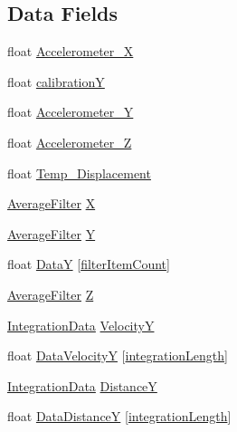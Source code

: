 \subsection*{Data Fields}
\begin{DoxyCompactItemize}
\item 
float \mbox{\hyperlink{struct_process_data___a92338f7520578c54d577bf8dd193186c}{Accelerometer\+\_\+X}}
\item 
float \mbox{\hyperlink{struct_process_data___a0630656d6ec984a6917aba7d0617d87b}{calibrationY}}
\item 
float \mbox{\hyperlink{struct_process_data___a1a3f3515022e230ceaf847b59f45d244}{Accelerometer\+\_\+Y}}
\item 
float \mbox{\hyperlink{struct_process_data___afe6d67e3ee7305c3f5fc242162aa13b2}{Accelerometer\+\_\+Z}}
\item 
float \mbox{\hyperlink{struct_process_data___ae36f07f578d32279404707bc16db33db}{Temp\+\_\+\+Displacement}}
\item 
\mbox{\hyperlink{filter__math__pincinato_8h_a05751bcbb0782121ff05ae3b7fc37dac}{Average\+Filter}} \mbox{\hyperlink{struct_process_data___a1dddeebb5e500ffea1704c56bad3e5de}{X}}
\item 
\mbox{\hyperlink{filter__math__pincinato_8h_a05751bcbb0782121ff05ae3b7fc37dac}{Average\+Filter}} \mbox{\hyperlink{struct_process_data___a999e007debe5468384855f5109e979c8}{Y}}
\item 
float \mbox{\hyperlink{struct_process_data___a19b2872341d3b0c7cf6c7b5744680b48}{DataY}} \mbox{[}\mbox{\hyperlink{interface___a_c_c_e_l__pincinato_8h_af704f1402c3ac42c867882facf46fc66}{filter\+Item\+Count}}\mbox{]}
\item 
\mbox{\hyperlink{filter__math__pincinato_8h_a05751bcbb0782121ff05ae3b7fc37dac}{Average\+Filter}} \mbox{\hyperlink{struct_process_data___adcecb30f0d09efbdf979b7162fd73a59}{Z}}
\item 
\mbox{\hyperlink{filter__math__pincinato_8h_a614628710e855bdeb4949c83265e87e6}{Integration\+Data}} \mbox{\hyperlink{struct_process_data___ac8287aab78b8f4b55b7284b8b9d2d6eb}{VelocityY}}
\item 
float \mbox{\hyperlink{struct_process_data___a4fa27dc016870a216daf63ba65059a0b}{Data\+VelocityY}} \mbox{[}\mbox{\hyperlink{interface___a_c_c_e_l__pincinato_8h_aeee7ebe36cd3653f48821e6d0da7029d}{integration\+Length}}\mbox{]}
\item 
\mbox{\hyperlink{filter__math__pincinato_8h_a614628710e855bdeb4949c83265e87e6}{Integration\+Data}} \mbox{\hyperlink{struct_process_data___a9505c01279b7b5fe0e636e607ad4d63d}{DistanceY}}
\item 
float \mbox{\hyperlink{struct_process_data___ac4266b27959dc8e308a8741c9913f93c}{Data\+DistanceY}} \mbox{[}\mbox{\hyperlink{interface___a_c_c_e_l__pincinato_8h_aeee7ebe36cd3653f48821e6d0da7029d}{integration\+Length}}\mbox{]}
\end{DoxyCompactItemize}


